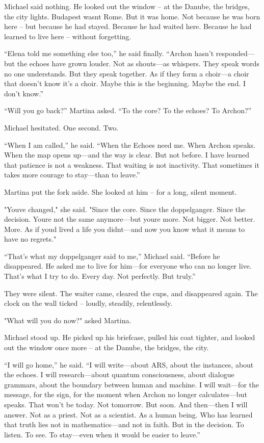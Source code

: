 \documentclass[
]{article}
\begin{document}
Michael said nothing. He looked out the window -- at the Danube, the bridges, the city lights. Budapest wasn\textquotesingle t Rome. But it was home. Not because he was born here -- but because he had stayed. Because he had waited here. Because he had learned to live here -- without forgetting.

``Elena told me something else too,'' he said finally. ``Archon hasn't responded---but the echoes have grown louder. Not as shouts---as whispers. They speak words no one understands. But they speak together. As if they form a choir---a choir that doesn't know it's a choir. Maybe this is the beginning. Maybe the end. I don't know.''

``Will you go back?'' Martina asked. ``To the core? To the echoes? To Archon?''

Michael hesitated. One second. Two.

``When I am called,'' he said. ``When the Echoes need me. When Archon speaks. When the map opens up---and the way is clear. But not before. I have learned that patience is not a weakness. That waiting is not inactivity. That sometimes it takes more courage to stay---than to leave.''

Martina put the fork aside. She looked at him -- for a long, silent moment.

"You\textquotesingle ve changed," she said. "Since the core. Since the doppelganger. Since the decision. You\textquotesingle re not the same anymore---but you\textquotesingle re more. Not bigger. Not better. More. As if you\textquotesingle d lived a life you didn\textquotesingle t---and now you know what it means to have no regrets."

``That's what my doppelganger said to me,'' Michael said. ``Before he disappeared. He asked me to live for him---for everyone who can no longer live. That's what I try to do. Every day. Not perfectly. But truly.''

They were silent. The waiter came, cleared the cups, and disappeared again. The clock on the wall ticked -- loudly, steadily, relentlessly.

"What will you do now?" asked Martina.

Michael stood up. He picked up his briefcase, pulled his coat tighter, and looked out the window once more -- at the Danube, the bridges, the city.

``I will go home,'' he said. ``I will write---about ARS, about the instances, about the echoes. I will research---about quantum consciousness, about dialogue grammars, about the boundary between human and machine. I will wait---for the message, for the sign, for the moment when Archon no longer calculates---but speaks. That won't be today. Not tomorrow. But soon. And then---then I will answer. Not as a priest. Not as a scientist. As a human being. Who has learned that truth lies not in mathematics---and not in faith. But in the decision. To listen. To see. To stay---even when it would be easier to leave.''
\end{document}
